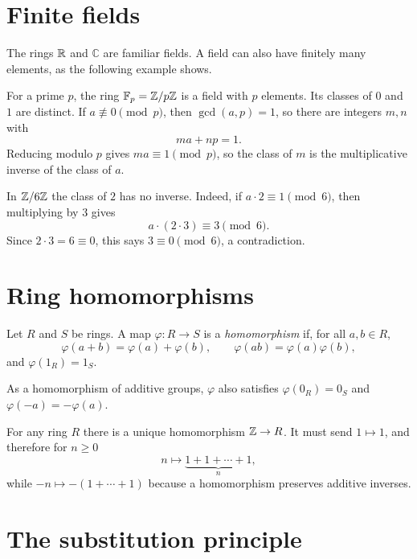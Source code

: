 \documentclass[reqno,11pt]{amsart}
\newcommand{\C}{\mathbb{C}}
\newcommand{\F}{\mathbb{F}}
\begin{document}
\section{Finite fields}

The rings $\mathbb{R}$ and $\C$ are familiar fields. A field can also have
finitely many elements, as the following example shows.

\begin{example}[The finite field $\F_p$]
For a prime $p$, the ring $\F_p=\Z/p\Z$ is a field with $p$ elements.
Its classes of $0$ and $1$ are distinct. If $a\not\equiv0\pmod p$,
then $\gcd(a,p)=1$, so there are integers $m,n$ with
\[
  ma+np=1.
\]
Reducing modulo $p$ gives $ma\equiv1\pmod p$, so the class of $m$ is
the multiplicative inverse of the class of $a$.
\end{example}

\begin{example}[A nonunit in $\Z/6\Z$]
In $\Z/6\Z$ the class of $2$ has no inverse. Indeed, if
$a\cdot2\equiv1\pmod6$, then multiplying by $3$ gives
\[
  a\cdot(2\cdot3)\equiv3\pmod 6.
\]
Since $2\cdot3=6\equiv0$, this says $3\equiv0\pmod6$, a contradiction.
\end{example}

\section{Ring homomorphisms}

\begin{define}
Let $R$ and $S$ be rings. A map $\varphi:R\to S$ is a
\emph{homomorphism} if, for all $a,b\in R$,
\[
  \varphi(a+b)=\varphi(a)+\varphi(b),\qquad
  \varphi(ab)=\varphi(a)\varphi(b),
\]
and $\varphi(1_R)=1_S$.
\end{define}

As a homomorphism of additive groups, $\varphi$ also satisfies
$\varphi(0_R)=0_S$ and $\varphi(-a)=-\varphi(a)$.

\begin{example}
For any ring $R$ there is a unique homomorphism $\mathbb{Z}\to R$. It must send
$1\mapsto1$, and therefore for $n\geq0$
\[
  n\longmapsto\underbrace{1+1+\cdots+1}_{n},
\]
while $-n\mapsto-(1+\cdots+1)$ because a homomorphism preserves
additive inverses.
\end{example}

\section{The substitution principle}
\end{document}

